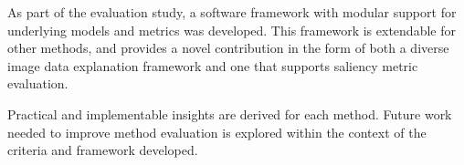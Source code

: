 \documentclass[12pt,openany,a4paper]{book}
\begin{document}
\noindent As part of the evaluation study, a software framework with modular support for underlying models and metrics was developed. This framework is extendable for other methods, and provides a novel contribution in the form of both a diverse image data explanation framework and one that supports saliency metric evaluation.

\vspace{0.15in}

\noindent Practical and implementable insights are derived for each method. Future work needed to improve method evaluation is explored within the context of the criteria and framework developed.





\end{document}
